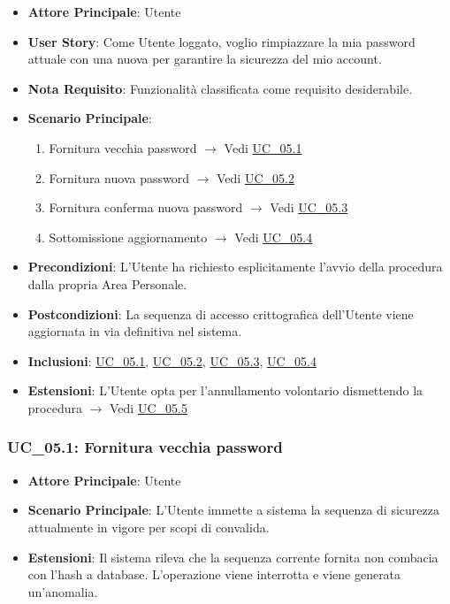 \begin{itemize}
    \item \textbf{Attore Principale}: Utente
    \item \textbf{User Story}: Come Utente loggato, voglio rimpiazzare la mia password attuale con una nuova per garantire la sicurezza del mio account.
    \item \textbf{Nota Requisito}: Funzionalità classificata come requisito desiderabile.
    \item \textbf{Scenario Principale}:
    \begin{enumerate}
        \item Fornitura vecchia password $\rightarrow$ Vedi \hyperref[uc_05.1]{UC\_05.1}
        \item Fornitura nuova password $\rightarrow$ Vedi \hyperref[uc_05.2]{UC\_05.2}
        \item Fornitura conferma nuova password $\rightarrow$ Vedi \hyperref[uc_05.3]{UC\_05.3}
        \item Sottomissione aggiornamento $\rightarrow$ Vedi \hyperref[uc_05.4]{UC\_05.4}
    \end{enumerate}
    \item \textbf{Precondizioni}: L'Utente ha richiesto esplicitamente l'avvio della procedura dalla propria Area Personale.
    \item \textbf{Postcondizioni}: La sequenza di accesso crittografica dell'Utente viene aggiornata in via definitiva nel sistema.
    \item \textbf{Inclusioni}: \hyperref[uc_05.1]{UC\_05.1}, \hyperref[uc_05.2]{UC\_05.2}, \hyperref[uc_05.3]{UC\_05.3}, \hyperref[uc_05.4]{UC\_05.4}
    \item \textbf{Estensioni}: L'Utente opta per l'annullamento volontario dismettendo la procedura $\rightarrow$ Vedi \hyperref[uc_05.5]{UC\_05.5}
\end{itemize}

\subsubsection{UC\_05.1: Fornitura vecchia password}
\label{uc_05.1}
\begin{itemize}
    \item \textbf{Attore Principale}: Utente
    \item \textbf{Scenario Principale}: L'Utente immette a sistema la sequenza di sicurezza attualmente in vigore per scopi di convalida.
    \item \textbf{Estensioni}: Il sistema rileva che la sequenza corrente fornita non combacia con l'hash a database. L'operazione viene interrotta e viene generata un'anomalia.
\end{itemize}

